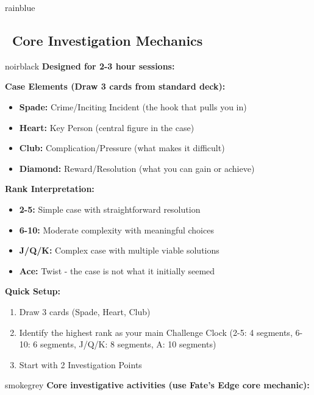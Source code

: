 \documentclass[11pt]{article}
\begin{document}
\newpage

\begin{noirsection}{rainblue}
\subsection*{\faFolder\ Core Investigation Mechanics}

\begin{casebox}{noirblack}
\textbf{Designed for 2-3 hour sessions:}

\textbf{Case Elements (Draw 3 cards from standard deck):}
\begin{itemize}
    \item \textbf{Spade:} Crime/Inciting Incident (the hook that pulls you in)
    \item \textbf{Heart:} Key Person (central figure in the case)
    \item \textbf{Club:} Complication/Pressure (what makes it difficult)
    \item \textbf{Diamond:} Reward/Resolution (what you can gain or achieve)
\end{itemize}

\textbf{Rank Interpretation:}
\begin{itemize}
    \item \textbf{2-5:} Simple case with straightforward resolution
    \item \textbf{6-10:} Moderate complexity with meaningful choices
    \item \textbf{J/Q/K:} Complex case with multiple viable solutions
    \item \textbf{Ace:} Twist - the case is not what it initially seemed
\end{itemize}

\textbf{Quick Setup:}
\begin{enumerate}
    \item Draw 3 cards (Spade, Heart, Club)
    \item Identify the highest rank as your main Challenge Clock (2-5: 4 segments, 6-10: 6 segments, J/Q/K: 8 segments, A: 10 segments)
    \item Start with 2 Investigation Points
\end{enumerate}
\end{casebox}

\begin{casebox}{smokegrey}
\textbf{Core investigative activities (use Fate's Edge core mechanic):}


\end{casebox}
\end{noirsection}
\end{document}
